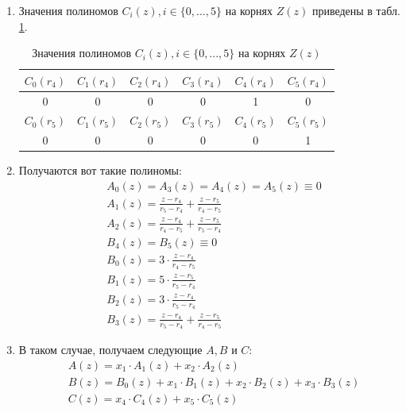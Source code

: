 \documentclass[12pt, a4paper]{extarticle}
\begin{document}
\begin{enumerate}
    \item Значения полиномов $C_i(z), i \in \{0, ..., 5\}$ на корнях $Z(z)$ приведены в табл. \ref{c-values}.
    
        \begin{table}[h]
            \centering
            \caption{Значения полиномов $C_i(z), i \in \{0, ..., 5\}$ на корнях $Z(z)$}
            \label{c-values}
            \begin{tabular}{|c|c|c|c|c|c|}
                \hline
                $C_0(r_4)$ & $C_1(r_4)$ & $C_2(r_4)$ & $C_3(r_4)$ & $C_4(r_4)$ & $C_5(r_4)$ \\
                \hline 
                0 & 0 & 0 & 0 & 1 & 0 \\
                \hline 
                $C_0(r_5)$ & $C_1(r_5)$ & $C_2(r_5)$ & $C_3(r_5)$ & $C_4(r_5)$ & $C_5(r_5)$ \\
                \hline 
                0 & 0 & 0 & 0 & 0 & 1 \\
                \hline 
            \end{tabular}
        \end{table}
        
    \item Получаются вот такие полиномы:
        \begin{equation*}
            \begin{split}
                & A_0(z) = A_3(z) = A_4(z) = A_5(z) \equiv 0 \\
                & A_1(z) = \frac{z - r_4}{r_5 - r_4} + \frac{z - r_5}{r_4 - r_5} \\
                & A_2(z) = \frac{z - r_4}{r_4 - r_5} + \frac{z - r_5}{r_5 - r_4} \\
                & B_4(z) = B_5(z) \equiv 0 \\
                & B_0(z) = 3 \cdot \frac{z - r_4}{r_4 - r_5} \\
                & B_1(z) = 5 \cdot \frac{z - r_5}{r_5 - r_4} \\
                & B_2(z) = 3 \cdot \frac{z - r_4}{r_5 - r_4} \\
                & B_3(z) = \frac{z - r_4}{r_5 - r_4} + \frac{z - r_5}{r_4 - r_5}
            \end{split}
        \end{equation*}
        
    \item В таком случае, получаем следующие $A, B$ и $C$:
        \begin{equation*}
            \begin{split}
                & A(z) = x_1 \cdot A_1(z) + x_2 \cdot A_2(z) \\
                & B(z) = B_0(z) + x_1 \cdot B_1(z) + x_2 \cdot B_2(z) + x_3 \cdot B_3(z) \\
                & C(z) = x_4 \cdot C_4(z) + x_5 \cdot C_5(z)
            \end{split}
        \end{equation*}
        

\end{enumerate}
\end{document}
